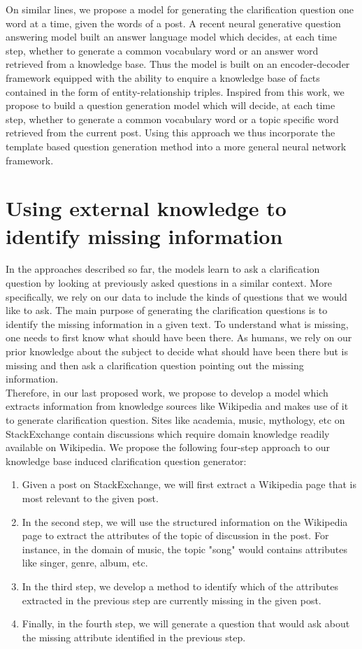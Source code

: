 \documentclass[11pt]{report}
\renewcommand\cite{\citep}	%
\begin{document}
\noindent
On similar lines, we propose a model for generating the clarification question one word at a time, given the words of a post. A recent neural generative question answering model \cite{yin2016neural} built an answer language model which decides, at each time step, whether to generate a common vocabulary word or an answer word retrieved from a knowledge base. Thus the model is built on an encoder-decoder framework equipped with the ability to enquire a knowledge base of facts contained in the form of entity-relationship triples. Inspired from this work, we propose to build a question generation model which will decide, at each time step, whether to generate a common vocabulary word or a topic specific word retrieved from the current post. Using this approach we thus incorporate the template based question generation method into a more general neural network framework.

\section{Using external knowledge to identify missing information}

In the approaches described so far, the models learn to ask a clarification question by looking at previously asked questions in a similar context. More specifically, we rely on our data to include the kinds of questions that we would like to ask. The main purpose of generating the clarification questions is to identify the missing information in a given text. To understand what is missing, one needs to first know what should have been there. As humans, we rely on our prior knowledge about the subject to decide what should have been there but is missing and then ask a clarification question pointing out the missing information. \\

\noindent
Therefore, in our last proposed work, we propose to develop a model which extracts information from knowledge sources like Wikipedia and makes use of it to generate clarification question. Sites like academia, music, mythology, etc on StackExchange contain discussions which require domain knowledge readily available on Wikipedia. We propose the following four-step approach to our knowledge base induced clarification question generator:
\begin{enumerate}
\item Given a post on StackExchange, we will first extract a Wikipedia page that is most relevant to the given post.
\item In the second step, we will use the structured information on the Wikipedia page to extract the attributes of the topic of discussion in the post. For instance, in the domain of music, the topic "song" would contains attributes like singer, genre, album, etc.
\item In the third step, we develop a method to identify which of the attributes extracted in the previous step are currently missing in the given post.
\item Finally, in the fourth step, we will generate a question that would ask about the missing attribute identified in the previous step.
\end{enumerate}
\end{document}
